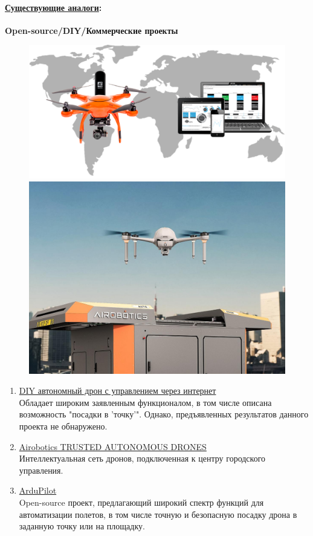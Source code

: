 \documentclass[a4paper,12pt]{article} %
\begin{document}
\paragraph{\underline{Существующие аналоги}:}
\textbf{Open-source/DIY/Коммерческие проекты}
\begin{figure}
    \centering
    \includegraphics[width=0.95\linewidth]{../img/diy_drone.png}
    \includegraphics[width=0.95\linewidth]{../img/airbotics.png}
\end{figure}
\begin{enumerate}
    \item \href{https://habr.com/ru/articles/414121/}{DIY автономный дрон с управлением через интернет} \\
    Обладает широким заявленным функционалом, в том числе описана возможность "посадки в 'точку'".
    Однако, предъявленных результатов данного проекта не обнаружено.

    \item \href{https://www.airoboticsdrones.com}{Airobotics TRUSTED AUTONOMOUS DRONES} \\
    Интеллектуальная сеть дронов, подключенная к центру городского управления.

    \item \href{https://www.dji.com/ru}{ArduPilot} \\
    Open-source проект, предлагающий широкий спектр функций для автоматизации полетов, в том числе точную и безопасную посадку дрона в заданную точку или на площадку.
\end{enumerate}
\end{document}
